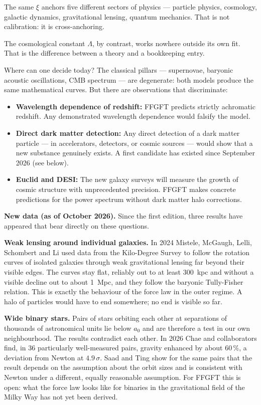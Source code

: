 \documentclass[11pt,oneside]{book}
\begin{document}
The same $\xi$ anchors five different sectors of physics —
particle physics, cosmology, galactic dynamics, gravitational
lensing, quantum mechanics. That is not calibration: it is
cross-anchoring.

The cosmological constant $\Lambda$, by contrast, works
nowhere outside its own fit. That is the difference between
a theory and a bookkeeping entry.

\medskip

Where can one decide today? The classical pillars —
supernovae, baryonic acoustic oscillations, CMB spectrum —
are degenerate: both models produce the same mathematical
curves. But there are observations that discriminate:

\begin{itemize}
  \item \textbf{Wavelength dependence of redshift:}
    FFGFT predicts strictly achromatic redshift.
    Any demonstrated wavelength dependence would falsify
    the model.
  \item \textbf{Direct dark matter detection:}
    Any direct detection of a dark matter particle —
    in accelerators, detectors, or cosmic sources —
    would show that a new substance genuinely exists. A first
    candidate has existed since September 2026 (see below).
  \item \textbf{Euclid and DESI:}
    The new galaxy surveys will measure the growth of
    cosmic structure with unprecedented precision.
    FFGFT makes concrete predictions for the power
    spectrum without dark matter halo corrections.
\end{itemize}

\medskip
\textbf{New data (as of October 2026).} Since the first edition,
three results have appeared that bear directly on these
questions.

\textbf{Weak lensing around individual galaxies.} In 2024 Mistele,
McGaugh, Lelli, Schombert and Li used data from the Kilo-Degree
Survey to follow the rotation curves of isolated galaxies through
weak gravitational lensing far beyond their visible edges. The
curves stay flat, reliably out to at least 300~kpc and without a
visible decline out to about 1~Mpc, and they follow the baryonic
Tully-Fisher relation. This is exactly the behaviour of the force
law in the outer regime. A halo of particles would have to end
somewhere; no end is visible so far.

\textbf{Wide binary stars.} Pairs of stars orbiting each other at
separations of thousands of astronomical units lie below $a_0$
and are therefore a test in our own neighbourhood. The results
contradict each other. In 2026 Chae and collaborators find, in
36 particularly well-measured pairs, gravity enhanced by about
60\,\%, a deviation from Newton at $4.9\,\sigma$. Saad and Ting
show for the same pairs that the result depends on the
assumption about the orbit sizes and is consistent with Newton
under a different, equally reasonable assumption. For FFGFT this
is open: what the force law looks like for binaries in the
gravitational field of the Milky Way has not yet been derived.
\end{document}
